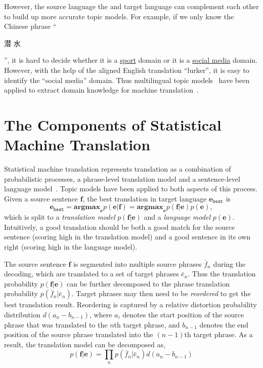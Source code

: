 However, the source language the and target language can complement
each other to build up more accurate topic models. For example, if we
only know the Chinese phrase ``\begin{CJK*}{UTF8}{gbsn}潜
  水\end{CJK*}'', it is hard to decide whether it is a
  \underline{sport} domain or it is a \underline{social media}
  domain. However, with the help of the aligned English translation
  ``lurker'', it is easy to identify the ``social media'' domain. Thus
  multilingual topic models~\citep{mimno-09,boyd-graber-10} have been
  applied to extract domain knowledge for machine
  translation~\citep{hu-14}.

\section{The Components of Statistical Machine Translation}

Statistical machine translation represents translation as a
combination of probabilistic processes, a phrase-level translation model and a sentence-level language model~\citep{koehn-03,koehn-09}. 
Topic models have been applied to both aspects of this process.
Given a source sentence $\mathbf{f}$, the best
translation in target language $\mathbf{e}_\texttt{best}$ is
\begin{equation}
\mathbf{e}_\texttt{best} = \textbf{argmax}_\mathbf{e} p(\mathbf{e}|\mathbf{f}) = \textbf{argmax}_\mathbf{e} p(\mathbf{f}|\mathbf{e}) p (\mathbf{e}),
\end{equation}
which is split to a \textit{translation model}
$p(\mathbf{f}|\mathbf{e})$ and a \textit{language model} $p
(\mathbf{e})$.
Intuitively, a good translation should be both a good match for the source sentence (scoring high in the translation model) and a good sentence in its own right (scoring high in the language model).

The source sentence $\mathbf{f}$ is segmented into multiple source
phrases $\bar{f}_n$ during the decoding, which are translated to a set
of target phrases $\bar{e}_n$. Thus the translation probability
$p(\mathbf{f}|\mathbf{e})$ can be further decomposed to the phrase
translation probability $p(\bar{f}_n | \bar{e}_n)$. Target phrases may then need to be \textit{reordered} to get the best
translation result. Reordering is captured by a relative distortion
probability distribution $d(a_n - b_{n-1})$, where $a_i$ denotes the
start position of the source phrase that was translated to the $n$th
target phrase, and $b_{n-1}$ denotes the end position of the source
phrase translated into the $(n-1)$th target phrase. As a result, the
translation model can be decomposed as,
\begin{equation}
p(\mathbf{f}|\mathbf{e}) = \prod_{n} p(\bar{f}_n | \bar{e}_n) d(a_n - b_{n-1})
\end{equation}

